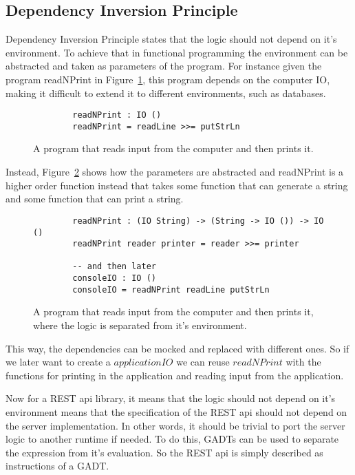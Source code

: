 \subsection{Dependency Inversion Principle} 

Dependency Inversion Principle states that the logic should not depend on it's
environment. To achieve that in functional programming the environment can
be abstracted and taken as parameters of the program. For instance given the
program readNPrint in Figure~\ref{diexample}, this program depends on the
computer IO, making it difficult to extend it to different environments, such as
databases. 

\begin{figure}[H]
    \begin{lstlisting}
        readNPrint : IO () 
        readNPrint = readLine >>= putStrLn
    \end{lstlisting}
    \caption{A program that reads input from the computer and then prints it.}
    \label{diexample}
\end{figure}

Instead, Figure~\ref{withdiexample} shows how the parameters are abstracted and
readNPrint is a higher order function instead that takes some function that
can generate a string and some function that can print a string.


\begin{figure}[H]
    \begin{lstlisting}
        readNPrint : (IO String) -> (String -> IO ()) -> IO ()
        readNPrint reader printer = reader >>= printer

        -- and then later
        consoleIO : IO ()
        consoleIO = readNPrint readLine putStrLn
    \end{lstlisting}
    \caption{A program that reads input from the computer and then prints it,
    where the logic is separated from it's environment.}
    \label{withdiexample}
\end{figure}

This way, the dependencies can be mocked and replaced with different ones. So if
we later want to create a $applicationIO$ we can reuse $readNPrint$ with the
functions for printing in the application and reading input from the
application.

Now for a REST api library, it means that the logic should not depend on it's
environment means that the specification of the REST api should not depend on
the server implementation. In other words, it should be trivial to port the
server logic to another runtime if needed. To do this, GADTs can be used to
separate the expression from it's evaluation. So the REST api is simply
described as instructions of a GADT. 


